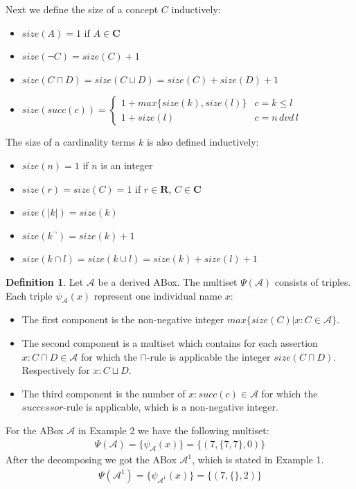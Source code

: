 \documentclass{book}
\theoremstyle{break}
\theoremstyle{definition}
\newtheorem{mydef}{Definition}
\begin{document}
Next we define the size of a concept $C$ inductively:
\begin{itemize}
\item $size(A)=1$ if $A\in\mathbf{C}$
\item $size(\neg C)=size(C)+1$
\item $size(C\sqcap D)=size(C\sqcup D)= size(C)+ size(D)+1$
\item $size(succ(c))=\begin{cases}
1+max\{size(k),size(l)\} & c=k\leq l \\
1+size(l)& c= n\,dvd\,l
\end{cases}$
\end{itemize}
The size of a cardinality terms $k$ is also defined inductively:
\begin{itemize}
\item $size(n)=1$ if $n$ is an integer
\item $size(r)=size(C)=1$ if $r\in\mathbf{R}$, $C\in\mathbf{C}$
\item $size(|k|)=size(k)$
\item $size(k^\neg)=size(k)+1$
\item $size(k\cap l)=size(k\cup l)= size(k)+ size(l)+1$
\end{itemize}
\begin{mydef}
Let $\mathcal{A}$ be a derived ABox. The multiset $\Psi(\mathcal{A})$ consists of triples. Each triple $\psi_\mathcal{A}(x)$ represent one individual name $x$:
\begin{itemize}
\item The first component is the non-negative integer $max\{size(C)|x:C\in\mathcal{A}\}$.
\item The second component is a multiset which contains for each assertion $x:C\sqcap D\in\mathcal{A}$ for which the $\sqcap$-rule is applicable the integer $size(C\sqcap D)$. Respectively for $x:C\sqcup D$.
\item The third component is the number of $x:succ(c)\in\mathcal{A}$ for which the $successor$-rule is applicable, which is a non-negative integer.
\end{itemize}
\end{mydef}
For the ABox $\mathcal{A}$ in Example 2 we have the following multiset:
\begin{align*}
\Psi(\mathcal{A})=\{\psi_\mathcal{A}(x)\}=\{(7,\{7,7\},0)\}
\end{align*}
After the decomposing we got the ABox $\mathcal{A}^1$, which is stated in Example 1.
\begin{align*}
\Psi(\mathcal{A}^1)=\{\psi_{\mathcal{A}^1}(x)\}=\{(7,\{\},2)\}
\end{align*}
\end{document}
